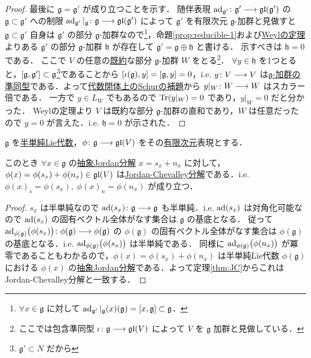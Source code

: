 \documentclass[rep_main]{subfiles}
\begin{document}
\begin{proof}
	最後に $\mathfrak{g} = \mathfrak{g}'$ が成り立つことを示す．
	随伴表現 $\operatorname{ad}_{\mathfrak{g}'} \colon \mathfrak{g}' \longrightarrow \mathfrak{gl} (\mathfrak{g}')$ の $\mathfrak{g} \subset \mathfrak{g}'$ への制限 $\operatorname{ad}_{\mathfrak{g}'}|_{\mathfrak{g}} \colon \mathfrak{g} \longrightarrow \mathfrak{gl}(\mathfrak{g}')$ によって $\mathfrak{g}'$ を有限次元 $\mathfrak{g}$-加群と見做すと $\mathfrak{g} \subset \mathfrak{g}'$ 自身は $\mathfrak{g}'$ の部分 $\mathfrak{g}$-加群なので\footnote{$\forall x \in \mathfrak{g}$ に対して $\ad_{\mathfrak{g}'}|_{\mathfrak{g}}(x)(\mathfrak{g}) = \comm{x}{\mathfrak{g}} \subset \mathfrak{g}$．}，命題\ref{prop:reducible-1}および\hyperref[thm:Weyl]{Weylの定理}よりある $\mathfrak{g}'$ の部分 $\mathfrak{g}$-加群 $\mathfrak{h}$ が存在して $\mathfrak{g}' = \mathfrak{g} \oplus \mathfrak{h}$ と書ける．
	示すべきは $\mathfrak{h} = 0$ である．
	ここで $V$ の任意の\hyperref[def:irr]{既約}な部分 $\mathfrak{g}$-加群 $W$ をとる\footnote{ここでは包含準同型 $\iota \colon \mathfrak{g} \longrightarrow \mathfrak{gl}(V)$ によって $V$ を $\mathfrak{g}$ 加群と見做している．}．
	$\forall y \in \mathfrak{h}$ を1つとると，$\comm{\mathfrak{g}}{\mathfrak{g}'} \subset \mathfrak{g}$\footnote{$\mathfrak{g}' \subset N$ だから}であることから $\comm{\iota(\mathfrak{g})}{y} = \comm{\mathfrak{g}}{y} = 0$，i.e. $y \colon V \longrightarrow V$ は\hyperref[def:g-module-hom]{$\mathfrak{g}$-加群の準同型}である．よって\hyperref[col:Schur-closed]{代数閉体上のSchurの補題}から $y|_W \colon W \longrightarrow W$ はスカラー倍である．
	一方で $y \in L_W$ でもあるので $\Tr(y|_W) = 0$ であり，$y|_W = 0$ だと分かった．
	Weylの定理より $V$ は既約な部分 $\mathfrak{g}$-加群の直和であり，$W$ は任意だったので $y = 0$ が言えた．i.e. $\mathfrak{h} = 0$ が示された．

\end{proof}

\begin{mycol}[label=col:JC]{}
	$\mathfrak{g}$ を\hyperref[def:semisimple-LieAlg]{半単純Lie代数}，$\phi \colon \mathfrak{g} \longrightarrow \mathfrak{gl}(V)$ をその\underline{有限次元}表現とする．

	このとき $\forall x \in \mathfrak{g}$ の\hyperref[def:abstruct-JC]{抽象Jordan分解} $x = s_x + n_x$ に対して，$\phi(x) = \phi(s_x) + \phi(n_x) \in \mathfrak{gl}(V)$ は\hyperref[prop:Jordan-Chevalley]{Jordan-Chevalley分解}である．i.e. $\phi(x)_s = \phi(s_x),\; \phi(x)_n = \phi(n_x)$ が成り立つ．
\end{mycol}

\begin{proof}
	$s_x$ は半単純なので $\operatorname{ad} (s_x) \colon \mathfrak{g} \longrightarrow \mathfrak{g}$ も半単純．i.e. $\operatorname{ad}(s_x)$ は対角化可能なので $\operatorname{ad}(s_x)$ の固有ベクトル全体がなす集合は $\mathfrak{g}$ の基底となる．
	従って $\operatorname{ad}_{\phi(\mathfrak{g})} \bigl( \phi(s_x) \bigr) \colon \phi(\mathfrak{g}) \longrightarrow \phi(\mathfrak{g})$ の $\phi(\mathfrak{g})$ の固有ベクトル全体がなす集合は $\phi(\mathfrak{g})$ の基底となる．i.e. $\operatorname{ad}_{\phi(\mathfrak{g})} \bigl( \phi(s_x) \bigr)$ は半単純である．
	同様に $\operatorname{ad}_{\phi(\mathfrak{g})} \bigl( \phi(n_x) \bigr)$ が冪零であることもわかるので，$\phi(x) = \phi(s_x) + \phi(n_x)$ は半単純Lie代数 $\phi(\mathfrak{g})$ における $\phi(x)$ の\hyperref[def:abstruct-JC]{抽象Jordan分解}である．よって定理\ref{thm:JC}からこれはJordan-Chevalley分解と一致する．
\end{proof}
\end{document}
